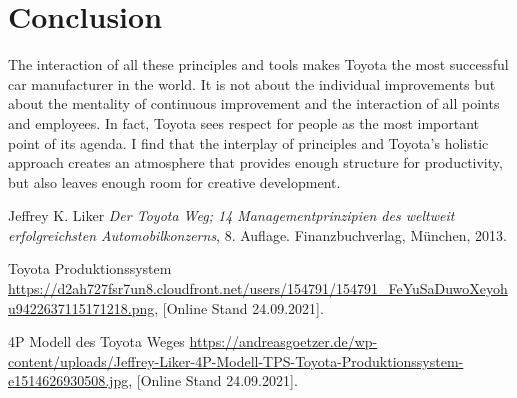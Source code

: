 \documentclass[a4paper,11pt]{article}
\begin{document}
\clearpage
  
\section{Conclusion}

The interaction of all these principles and tools makes Toyota the most
successful car manufacturer in the world. It is not about the individual
improvements but about the mentality of continuous improvement and the
interaction of all points and employees. In fact, Toyota sees respect for
people as the most important point of its agenda. I find that the interplay of
principles and Toyota's holistic approach creates an atmosphere that provides
enough structure for productivity, but also leaves enough room for creative
development.

\begin{thebibliography}{99}

 Jeffrey K. Liker \emph{Der Toyota Weg; 14
  Managementprinzipien des weltweit erfolgreichsten Automobilkonzerns},
  8. Auf\-lage. Finanzbuchverlag, München, 2013.

 Toyota Produktionssystem
  \url{https://d2ah727fsr7un8.cloudfront.net/users/154791/154791_FeYuSaDuwoXeyohu9422637115171218.png},
      [Online Stand 24.09.2021].

 4P Modell des Toyota Weges
  \url{https://andreasgoetzer.de/wp-content/uploads/Jeffrey-Liker-4P-Modell-TPS-Toyota-Produktionssystem-e1514626930508.jpg},
      [Online Stand 24.09.2021].

\end{thebibliography}
\end{document}
